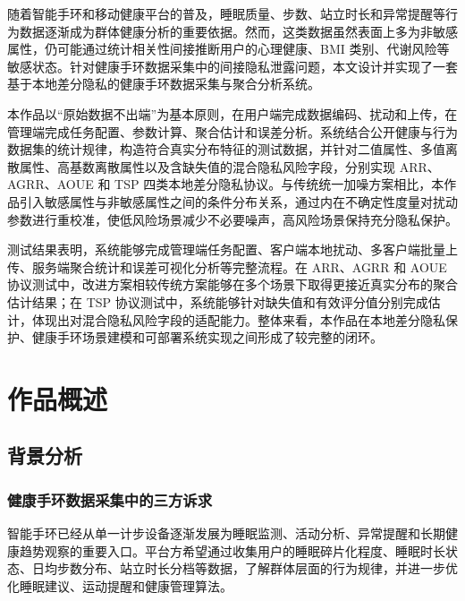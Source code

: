 \documentclass{cumcmthesis}
\numberwithin{equation}{section}
\numberwithin{figure}{section}
\numberwithin{table}{section}
\begin{document}
\maketitle
\newpage
\setcounter{tocdepth}{2}
\tableofcontents
\newpage

\begin{cnabstract}

随着智能手环和移动健康平台的普及，睡眠质量、步数、站立时长和异常提醒等行为数据逐渐成为群体健康分析的重要依据。然而，这类数据虽然表面上多为非敏感属性，仍可能通过统计相关性间接推断用户的心理健康、BMI 类别、代谢风险等敏感状态。针对健康手环数据采集中的间接隐私泄露问题，本文设计并实现了一套基于本地差分隐私的健康手环数据采集与聚合分析系统。

本作品以“原始数据不出端”为基本原则，在用户端完成数据编码、扰动和上传，在管理端完成任务配置、参数计算、聚合估计和误差分析。系统结合公开健康与行为数据集的统计规律，构造符合真实分布特征的测试数据，并针对二值属性、多值离散属性、高基数离散属性以及含缺失值的混合隐私风险字段，分别实现 ARR、AGRR、AOUE 和 TSP 四类本地差分隐私协议。与传统统一加噪方案相比，本作品引入敏感属性与非敏感属性之间的条件分布关系，通过内在不确定性度量对扰动参数进行重校准，使低风险场景减少不必要噪声，高风险场景保持充分隐私保护。

测试结果表明，系统能够完成管理端任务配置、客户端本地扰动、多客户端批量上传、服务端聚合统计和误差可视化分析等完整流程。在 ARR、AGRR 和 AOUE 协议测试中，改进方案相较传统方案能够在多个场景下取得更接近真实分布的聚合估计结果；在 TSP 协议测试中，系统能够针对缺失值和有效评分值分别完成估计，体现出对混合隐私风险字段的适配能力。整体来看，本作品在本地差分隐私保护、健康手环场景建模和可部署系统实现之间形成了较完整的闭环。

\end{cnabstract}

\clearpage
\section{作品概述}

\subsection{背景分析}

\subsubsection{健康手环数据采集中的三方诉求}

智能手环已经从单一计步设备逐渐发展为睡眠监测、活动分析、异常提醒和长期健康趋势观察的重要入口。平台方希望通过收集用户的睡眠碎片化程度、睡眠时长状态、日均步数分布、站立时长分档等数据，了解群体层面的行为规律，并进一步优化睡眠建议、运动提醒和健康管理算法。
\end{document}
